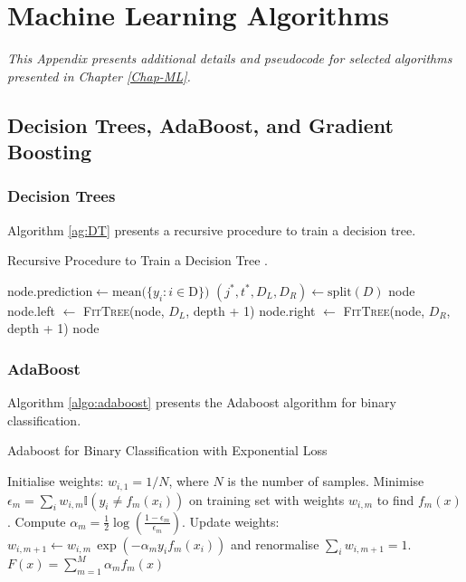 \chapter{Machine Learning Algorithms}\label{app:MLalgo}
\ChapFrame

\textit{This Appendix presents additional details and pseudocode for selected algorithms presented in Chapter \ref{Chap-ML}.}

\section{Decision Trees, AdaBoost, and Gradient Boosting}
\subsection{Decision Trees}\label{app:dtalgo}
Algorithm \ref{ag:DT} presents a recursive procedure to train a decision tree. 
\begin{algorithm}
    \caption{Recursive Procedure to Train a Decision Tree \cite{MurphyML}.}
    \begin{algorithmic}
        \State $\text{node.prediction} \gets \text{mean}(\{y_i : i \in $D$\})$ 
        \State $(j^*, t^*, D_L, D_R) \gets \text{split}(D)$
            \State \Return node
        \Else
            \State node.left $\gets$ \textsc{FitTree}(node, $D_L$, depth + 1)
            \State node.right $\gets$ \textsc{FitTree}(node, $D_R$, depth + 1)
            \State \Return node
        \EndIf
    \EndFunction
    \end{algorithmic}
    \label{ag:DT}
\end{algorithm}

\subsection{AdaBoost}
Algorithm \ref{algo:adaboost} presents the Adaboost algorithm for binary classification. 
\begin{algorithm}
    \caption{Adaboost for Binary Classification with Exponential Loss \cite{MurphyML}}
    \label{algo:adaboost}
    \begin{algorithmic}
    \State Initialise weights: $w_{i,1} = 1/N$, where $N$ is the number of samples.
        \State Minimise $\epsilon_m = \sum_i w_{i,m} \mathbb{I}(y_i \neq f_m(x_i))$ on training set with weights $w_{i,m}$ to find $f_m(x)$.
        \State Compute $\alpha_m = \frac{1}{2} \log\left(\frac{1 - \epsilon_m}{\epsilon_m}\right)$.
        \State Update weights: $w_{i,m+1} \leftarrow w_{i,m} \, \exp(-\alpha_m y_i f_m(x_i))$ and renormalise $\sum_i w_{i, m+1} = 1$.
    \EndFor
    \State \Return $F(x) = \sum_{m=1}^M \alpha_m f_m(x)$
    \end{algorithmic}
\end{algorithm}

